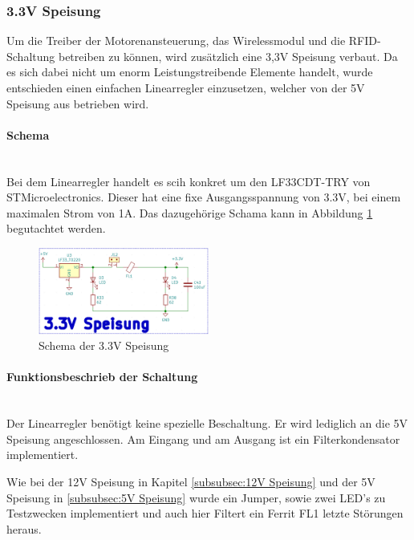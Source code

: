 \subsubsection{3.3V Speisung}
\label{subsubsec:3.3V Speisung}

Um die Treiber der Motorenansteuerung, das Wirelessmodul und die RFID-Schaltung betreiben zu können, wird zusätzlich eine 3,3V Speisung verbaut. Da es sich dabei nicht um enorm Leistungstreibende Elemente handelt, wurde entschieden einen einfachen Linearregler einzusetzen, welcher von der 5V Speisung aus betrieben wird. 

\paragraph{Schema}\mbox{}\\

Bei dem Linearregler handelt es scih konkret um den LF33CDT-TRY von STMicroelectronics. Dieser hat eine fixe Ausgangsspannung von 3.3V, bei einem maximalen Strom von 1A. Das dazugehörige Schama kann in Abbildung \ref{fig:Schema_Speisung_3.3V} begutachtet werden.

\begin{figure}[h!]
	\centering
	\includegraphics[width=0.5\textwidth]{graphics/Schema_Speisung_3,3V.png}
	\caption{Schema der 3.3V Speisung}
	\label{fig:Schema_Speisung_3.3V}
\end{figure} 


\paragraph{Funktionsbeschrieb der Schaltung}\mbox{}\\

Der Linearregler benötigt keine spezielle Beschaltung. Er wird lediglich an die 5V Speisung angeschlossen. Am Eingang und am Ausgang ist ein Filterkondensator implementiert. 

Wie bei der 12V Speisung in Kapitel \ref{subsubsec:12V Speisung} und der 5V Speisung in \ref{subsubsec:5V Speisung} wurde ein Jumper, sowie zwei LED's zu Testzwecken implementiert und auch hier Filtert ein Ferrit FL1 letzte Störungen heraus.